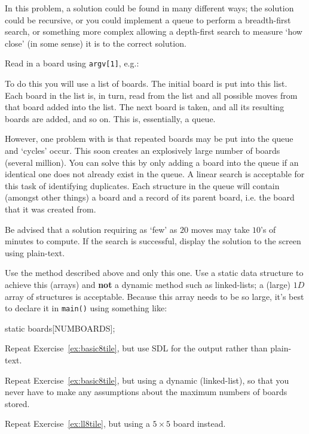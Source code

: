 In this problem, a solution could be found in many different ways; the solution could be recursive,
or you could implement a queue to perform a breadth-first search, or something more complex allowing
a depth-first search to measure `how close' (in some sense) it is to the correct solution. 

\begin{exercise}
\label{ex:basic8tile}
Read in a board using \verb^argv[1]^, e.g.:

To do this you will use a list of boards. The initial board is
put into this list. Each board in the list is, in turn, read from the
list and all possible moves from that board added into the list. The
next board is taken, and all its resulting boards are added, and so
on.  This is, essentially, a queue.

However, one problem with is that repeated boards may be put into the queue and
`cycles' occur.  This soon creates an explosively large number of
boards (several million).  You can solve this by only adding a board
into the queue if an identical one does not already exist in the queue.
A linear search is acceptable for this task of identifying duplicates.
Each structure in the queue will contain (amongst other things)
a board and a record of its parent board, i.e. the board that it was
created from.

Be advised that a solution requiring as `few' as $20$ moves may take
$10$'s of minutes to compute. If the search is successful, display the solution
to the screen using plain-text.

Use the method described above and only this one. Use a static data structure to achieve
this (arrays) and {\bf not} a dynamic method such as linked-lists; a (large) $1D$ array
of structures is acceptable. Because this array needs to be
so large, it's best to declare it in \verb^main()^ using something like:
\begin{codesnippet}
static boards[NUMBOARDS];
\end{codesnippet}

\end{exercise}

\begin{exercise}
Repeat Exercise~\ref{ex:basic8tile}, but use SDL for the output rather than plain-text.
\end{exercise}

\begin{exercise}
\label{ex:ll8tile}
Repeat Exercise~\ref{ex:basic8tile}, but using a dynamic (linked-list), so that you never have to make any assumptions about the maximum numbers of boards stored.
\end{exercise}

\begin{exercise}
Repeat Exercise~\ref{ex:ll8tile}, but using a $5 $ board instead.
\end{exercise}
